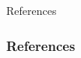 \documentclass{beamer}
\begin{document}
%
%
\begin{frame}{References}

        \tiny
        \frametitle{References}
        
        \color{black}
        
\end{frame}
\end{document}
